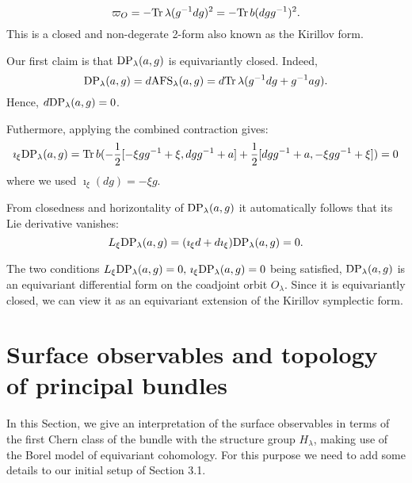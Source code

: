 \documentclass[11pt]{report}
\theoremstyle{plain}
\theoremstyle{definition}
\theoremstyle{remark}
\theoremstyle{remark}
\numberwithin{equation}{section}
\begin{document}
%
\begin{equation}
\varpi_O = - {\rm Tr} \, \lambda(g^{-1}dg)^2= - {\rm Tr} \, b(dg g^{-1})^2.
\end{equation}
This is a closed and non-degerate 2-form also known as the Kirillov form. 

Our first claim is that ${\rm DP}_\lambda(a,g)$ is equivariantly closed. Indeed,
%
$$
{\rm DP}_\lambda(a,g) = d {\rm AFS}_\lambda(a,g)=d {\rm Tr} \, \lambda(g^{-1} dg + g^{-1} a g).
$$
Hence,  $d {\rm DP}_\lambda(a,g)= 0$.


Futhermore, applying the combined contraction gives:
%
\begin{equation}
\imath_{\xi} {\rm DP}_\lambda(a,g) = {\rm Tr} \, b (  - \frac{1}{2} [-\xi g g^{-1} + \xi , dg g^{-1} + a] + \frac{1}{2} [dg g^{-1} + a , - \xi g g^{-1} + \xi] ) = 0
\end{equation}
where we used $\imath_{\xi}(dg) = -\xi g$.

From closedness and horizontality of ${\rm DP}_\lambda(a,g)$ it automatically follows that its Lie derivative vanishes:
%
\begin{equation}
L_{\xi} {\rm DP}_\lambda(a,g) = (\imath_{\xi} d + d \imath_{\xi}) {\rm DP}_\lambda(a,g) = 0.
\end{equation}

 The two conditions $L_{\xi} {\rm DP}_\lambda(a,g) = 0, \, \imath_{\xi} {\rm DP}_\lambda(a,g) = 0$ being satisfied,  ${\rm DP}_\lambda(a,g)$ is an equivariant differential form on the coadjoint orbit $O_\lambda$.  Since it is equivariantly closed, we can view it as an equivariant extension of the Kirillov symplectic form.







\section{Surface observables and topology of principal bundles}

In this Section, we give an interpretation of the surface observables in terms of the first Chern class of the bundle with the structure group $H_\lambda$, making use of the Borel model of equivariant cohomology. 
For this purpose we need to add some details to our initial setup of Section 3.1. 
\end{document}
